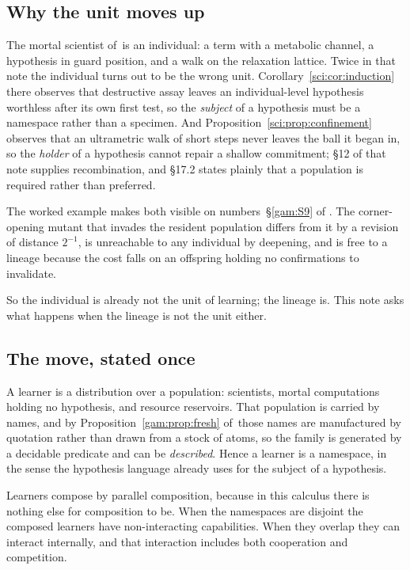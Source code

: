 \subsection{Why the unit moves up}\label{com:S1.1}

The mortal scientist of~\chSci is an individual: a term with a metabolic channel, a
hypothesis in guard position, and a walk on the relaxation lattice. Twice in that note the
individual turns out to be the wrong unit. Corollary~\ref{sci:cor:induction} there observes that destructive assay
leaves an individual-level hypothesis worthless after its own first test, so the \emph{subject} of
a hypothesis must be a namespace rather than a specimen. And Proposition~\ref{sci:prop:confinement} observes that an
ultrametric walk of short steps never leaves the ball it began in, so the \emph{holder} of a
hypothesis cannot repair a shallow commitment; \S12 of that note supplies recombination, and
\S17.2 states plainly that a population is required rather than preferred.

The worked example makes both visible on numbers~\S\ref{gam:S9} of \chGame. The corner-opening
mutant that invades the resident population differs from it by a revision of distance $2^{-1}$,
is unreachable to any individual by deepening, and is free to a lineage because the cost falls on
an offspring holding no confirmations to invalidate.

So the individual is already not the unit of learning; the lineage is. This note asks what happens
when the lineage is not the unit either.

\subsection{The move, stated once}\label{com:S1.2}

A learner is a distribution over a population: scientists, mortal computations holding no
hypothesis, and resource reservoirs. That population is carried by names, and by Proposition~\ref{gam:prop:fresh}
of~\chGame those names are manufactured by quotation rather than drawn from a stock of
atoms, so the family is generated by a decidable predicate and can be \emph{described}. Hence a
learner is a namespace, in the sense the hypothesis language already uses for the subject of a
hypothesis.

Learners compose by parallel composition, because in this calculus there is nothing else for
composition to be. When the namespaces are disjoint the composed learners have non-interacting
capabilities. When they overlap they can interact internally, and that interaction includes both
cooperation and competition.

